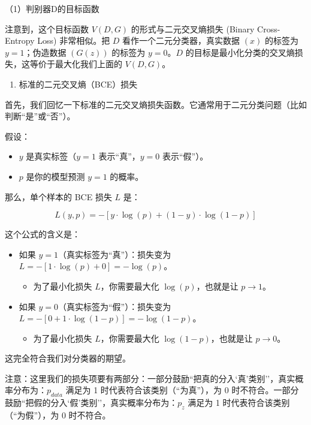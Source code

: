 （1）判别器D的目标函数

注意到，这个目标函数 \(V(D, G)\) 的形式与二元交叉熵损失 (Binary Cross-Entropy Loss) 非常相似。把 \(D\) 看作一个二元分类器，真实数据 \((x)\) 的标签为 \(y=1\)；伪造数据 \((G(z))\) 的标签为 \(y=0\)。\(D\) 的目标是最小化分类的交叉熵损失，这等价于最大化我们上面的 \(V(D, G)\)。

\begin{enumerate}
\def\labelenumi{\arabic{enumi}.}
\tightlist
\item
  标准的二元交叉熵（BCE）损失
\end{enumerate}

首先，我们回忆一下标准的二元交叉熵损失函数。它通常用于二元分类问题（比如判断``是''或``否''）。

假设：

\begin{itemize}
\tightlist
\item
  \(y\) 是真实标签（\(y=1\) 表示``真''，\(y=0\) 表示``假''）。
\item
  \(p\) 是你的模型预测 \(y=1\) 的概率。
\end{itemize}

那么，单个样本的 BCE 损失 \(L\) 是：

\[
L(y,p) = -[y\cdot\log(p) + (1-y)\cdot\log(1-p)]
\]

这个公式的含义是：

\begin{itemize}
\tightlist
\item
  如果 \(y=1\)（真实标签为``真''）：损失变为 \(L=-[1\cdot\log(p)+0]=-\log(p)\)。

  \begin{itemize}
  \tightlist
  \item
    为了最小化损失 \(L\)，你需要最大化 \(\log(p)\)，也就是让 \(p\to 1\)。
  \end{itemize}
\item
  如果 \(y=0\)（真实标签为``假''）：损失变为 \(L=-[0+1\cdot\log(1-p)]=-\log(1-p)\)。

  \begin{itemize}
  \tightlist
  \item
    为了最小化损失 \(L\)，你需要最大化 \(\log(1-p)\)，也就是让 \(p\to 0\)。
  \end{itemize}
\end{itemize}

这完全符合我们对分类器的期望。

注意：这里我们的损失项要有两部分：一部分鼓励``把真的分入`真'类别''，真实概率分布为：\(p_{data}\) 满足为 1 时代表符合该类别（``为真''），为 0 时不符合。一部分鼓励``把假的分入`假'类别''，真实概率分布为：\(p_z\) 满足为 1 时代表符合该类别（``为假''），为 0 时不符合。

